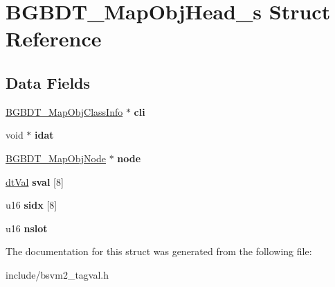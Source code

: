 \hypertarget{structBGBDT__MapObjHead__s}{\section{B\-G\-B\-D\-T\-\_\-\-Map\-Obj\-Head\-\_\-s Struct Reference}
\label{structBGBDT__MapObjHead__s}
}
\subsection*{Data Fields}
\begin{DoxyCompactItemize}
\item 
\hypertarget{structBGBDT__MapObjHead__s_acb6e94ced471f0f7d6960810b1c3b4e1}{\hyperlink{structBGBDT__MapObjClassInfo__s}{B\-G\-B\-D\-T\-\_\-\-Map\-Obj\-Class\-Info} $\ast$ {\bfseries cli}}\label{structBGBDT__MapObjHead__s_acb6e94ced471f0f7d6960810b1c3b4e1}

\item 
\hypertarget{structBGBDT__MapObjHead__s_a7f338acc32a1daf2de5dd8d503335336}{void $\ast$ {\bfseries idat}}\label{structBGBDT__MapObjHead__s_a7f338acc32a1daf2de5dd8d503335336}

\item 
\hypertarget{structBGBDT__MapObjHead__s_ab00f609d5b6e05459c6c9715a88c71fa}{\hyperlink{structBGBDT__MapObjNode__s}{B\-G\-B\-D\-T\-\_\-\-Map\-Obj\-Node} $\ast$ {\bfseries node}}\label{structBGBDT__MapObjHead__s_ab00f609d5b6e05459c6c9715a88c71fa}

\item 
\hypertarget{structBGBDT__MapObjHead__s_aecba2e53b51e6c518c87403bd5a0a5d6}{\hyperlink{unionBGBDT__TagValue__s}{dt\-Val} {\bfseries sval} \mbox{[}8\mbox{]}}\label{structBGBDT__MapObjHead__s_aecba2e53b51e6c518c87403bd5a0a5d6}

\item 
\hypertarget{structBGBDT__MapObjHead__s_abe0fd7410eb968c6c6118a27e627f648}{u16 {\bfseries sidx} \mbox{[}8\mbox{]}}\label{structBGBDT__MapObjHead__s_abe0fd7410eb968c6c6118a27e627f648}

\item 
\hypertarget{structBGBDT__MapObjHead__s_a371f35d9fe9aef7ad803b71fc68497d7}{u16 {\bfseries nslot}}\label{structBGBDT__MapObjHead__s_a371f35d9fe9aef7ad803b71fc68497d7}

\end{DoxyCompactItemize}


The documentation for this struct was generated from the following file\-:\begin{DoxyCompactItemize}
\item 
include/bsvm2\-\_\-tagval.\-h\end{DoxyCompactItemize}
